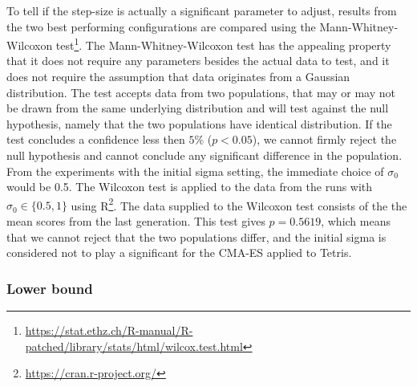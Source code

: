 To tell if the step-size is actually a significant parameter to adjust, results from 
the two best performing configurations are compared using the Mann-Whitney-Wilcoxon test\footnote{\url{https://stat.ethz.ch/R-manual/R-patched/library/stats/html/wilcox.test.html}}.
The Mann-Whitney-Wilcoxon test has the appealing property that it does not require any parameters
besides the actual data to test, and it does not require the assumption that data originates 
from a Gaussian distribution. The test accepts data from two populations, that may or may not 
be drawn from the same underlying distribution and will test against the null hypothesis, 
namely that the two populations have identical distribution. If the test concludes a 
confidence less then $5\%$ ($p < 0.05$), we cannot firmly reject the null hypothesis 
and cannot conclude any significant difference in the population. From the experiments
with the initial sigma setting, the immediate choice of $\sigma_0$ would be 0.5.
The Wilcoxon test is applied to the data from the runs with $\sigma_0 \in \{0.5, 1\}$
using R\footnote{\url{https://cran.r-project.org/}}. The data supplied
to the Wilcoxon test consists of the the mean scores from the last generation.
This test gives $p=0.5619$, which means that we cannot reject that the two 
populations differ, and the initial sigma is considered not to play a significant 
for the CMA-ES applied to Tetris.

\subsubsection{Lower bound}

